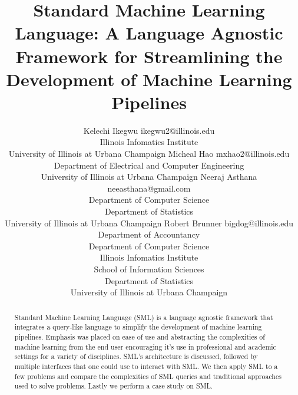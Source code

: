 \documentclass[jair,twoside,11pt,theapa]{article}
\begin{document}
\title{Standard Machine Learning Language: A Language Agnostic Framework for Streamlining the Development of Machine Learning Pipelines}

\author{\name Kelechi Ikegwu \email ikegwu2@illinois.edu \\
       \addr Illinois Infomatics Institute \\ University of Illinois at Urbana Champaign
       \AND
       \name Micheal Hao  \email mxhao2@illinois.edu \\
       \addr Department of Electrical and Computer Engineering \\ University of Illinois at Urbana Champaign
       \AND
       \name Neeraj Asthana \email neeasthana@gmail.com \\
       \addr Department of Computer Science \\ Department of Statistics \\ University of Illinois at Urbana Champaign 
       \AND
       \name Robert Brunner \email bigdog@illinois.edu\\
       \addr Department of Accountancy \\  Department of Computer Science \\ Illinois Infomatics Institute \\  School of Information Sciences \\ Department of Statistics \\  University of Illinois at Urbana Champaign}


\maketitle


\begin{abstract}
Standard Machine Learning Language (SML) is a language agnostic framework that integrates a query-like language to simplify the development of machine learning pipelines. Emphasis was placed on ease of use and abstracting the complexities of machine learning from the end user encouraging it's use in professional and academic settings for a variety of disciplines. SML's architecture is discussed, followed by multiple interfaces that one could use to interact with SML. We then apply SML to a few problems and compare the complexities of SML queries and traditional approaches used to solve problems. Lastly we perform a case study on SML.
\end{abstract}
\end{document}
